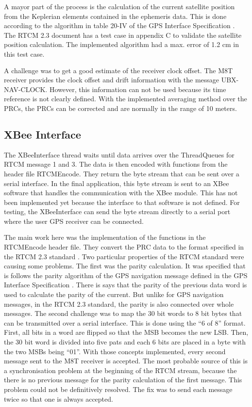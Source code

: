 A mayor part of the process is the calculation of the current satellite position from the Keplerian elements contained in the ephemeris data.
This is done according to the algorithm in table 20-IV of the GPS Interface Specification \cite{IS-GPS-200}.
The RTCM 2.3 document \cite{RTCM_2.3} has a test case in appendix C to validate the satellite position calculation.
The implemented algorithm had a max. error of 1.2 cm in this test case.

A challenge was to get a good estimate of the receiver clock offset.
The M8T receiver provides the clock offset and drift information with the message UBX-NAV-CLOCK.
However, this information can not be used because its time reference is not clearly defined.
With the implemented averaging method over the PRCs, the PRCs can be corrected and are normally in the range of 10 meters.

\subsection{XBee Interface}

The XBeeInterface thread waits until data arrives over the ThreadQueues for RTCM message 1 and 3.
The data is then encoded with functions from the header file RTCMEncode.
They return the byte stream that can be sent over a serial interface.
In the final application, this byte stream is sent to an XBee software that handles the communication with the XBee module.
This has not been implemented yet because the interface to that software is not defined.
For testing, the XBeeInterface can send the byte stream directly to a serial port where the user GPS receiver can be connected.

The main work here was the implementation of the functions in the RTCMEncode header file.
They convert the PRC data to the format specified in the RTCM 2.3 standard \cite{RTCM_2.3}.
Two particular properties of the RTCM standard were causing some problems.
The first was the parity calculation.
It was specified that is follows the parity algorithm of the GPS navigation message defined in the GPS Interface Specification \cite{IS-GPS-200}.
There is says that the parity of the previous data word is used to calculate the parity of the current.
But unlike for GPS navigation messages, in the RTCM 2.3 standard, the parity is also connected over whole messages.
The second challenge was to map the 30 bit words to 8 bit bytes that can be transmitted over a serial interface.
This is done using the ``6 of 8'' format.
First, all bits in a word are flipped so that the MSB becomes the new LSB.
Then, the 30 bit word is divided into five pats and each 6 bits are placed in a byte with the two MSBs being ``01''.
With those concepts implemented, every second message sent to the M8T receiver is accepted.
The most probable source of this is a synchronisation problem at the beginning of the RTCM stream, because the there is no previous message for the parity calculation of the first message.
This problem could not be definitively resolved.
The fix was to send each message twice so that one is always accepted.

